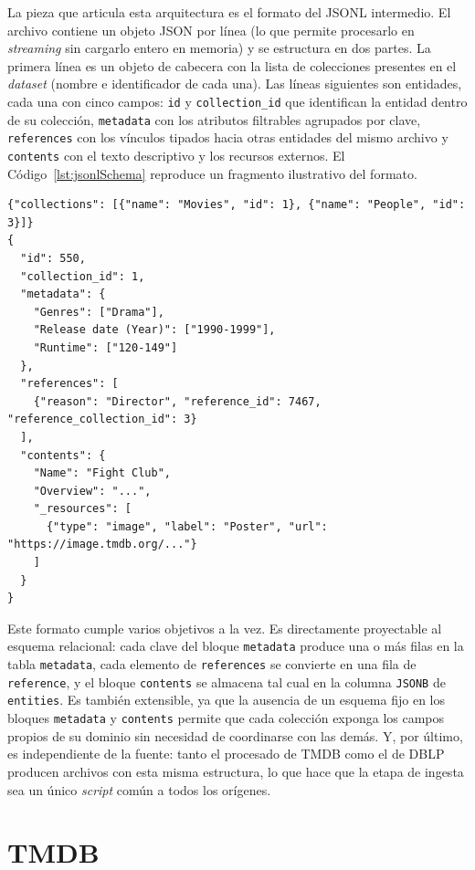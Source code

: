 La pieza que articula esta arquitectura es el formato del JSONL
intermedio. El archivo contiene un objeto JSON por línea (lo que
permite procesarlo en \textit{streaming} sin cargarlo entero en memoria) y se
estructura en dos partes. La primera línea es un objeto de cabecera con
la lista de colecciones presentes en el \textit{dataset} (nombre e identificador
de cada una). Las líneas siguientes son entidades, cada una con cinco
campos: \texttt{id} y \texttt{collection\_id} que identifican la
entidad dentro de su colección, \texttt{metadata} con los atributos
filtrables agrupados por clave, \texttt{references} con los vínculos
tipados hacia otras entidades del mismo archivo y \texttt{contents}
con el texto descriptivo y los recursos externos. El
Código~\ref{lst:jsonlSchema} reproduce un fragmento ilustrativo del
formato.

\begin{lstlisting}[style=jsonStyle, caption=Esquema del JSONL intermedio, label=lst:jsonlSchema]
{"collections": [{"name": "Movies", "id": 1}, {"name": "People", "id": 3}]}
{
  "id": 550,
  "collection_id": 1,
  "metadata": {
    "Genres": ["Drama"],
    "Release date (Year)": ["1990-1999"],
    "Runtime": ["120-149"]
  },
  "references": [
    {"reason": "Director", "reference_id": 7467, "reference_collection_id": 3}
  ],
  "contents": {
    "Name": "Fight Club",
    "Overview": "...",
    "_resources": [
      {"type": "image", "label": "Poster", "url": "https://image.tmdb.org/..."}
    ]
  }
}
\end{lstlisting}

Este formato cumple varios objetivos a la vez. Es directamente
proyectable al esquema relacional: cada clave del bloque
\texttt{metadata} produce una o más filas en la tabla \texttt{metadata},
cada elemento de \texttt{references} se convierte en una fila de
\texttt{reference}, y el bloque \texttt{contents} se almacena tal cual
en la columna \texttt{JSONB} de \texttt{entities}. Es también
extensible, ya que la ausencia de un esquema fijo en los bloques
\texttt{metadata} y \texttt{contents} permite que cada colección
exponga los campos propios de su dominio sin necesidad de coordinarse
con las demás. Y, por último, es independiente de la fuente: tanto el
procesado de TMDB como el de DBLP producen archivos con esta misma
estructura, lo que hace que la etapa de ingesta sea un único \textit{script}
común a todos los orígenes.

\section{TMDB}

